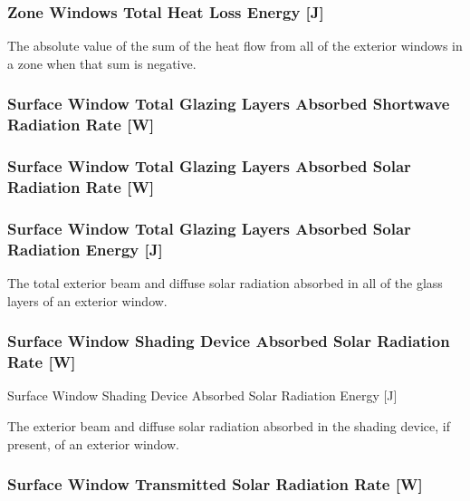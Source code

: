 \subsubsection{Zone Windows Total Heat Loss Energy {[}J{]}}\label{zone-windows-total-heat-loss-energy-j}

The absolute value of the sum of the heat flow from all of the exterior windows in a zone when that sum is negative.

\subsubsection{Surface Window Total Glazing Layers Absorbed Shortwave Radiation Rate {[}W{]}}\label{surface-window-total-glazing-layers-absorbed-shortwave-radiation-rate-w}

\subsubsection{Surface Window Total Glazing Layers Absorbed Solar Radiation Rate {[}W{]}}\label{surface-window-total-glazing-layers-absorbed-solar-radiation-rate-w}

\subsubsection{Surface Window Total Glazing Layers Absorbed Solar Radiation Energy {[}J{]}}\label{surface-window-total-glazing-layers-absorbed-solar-radiation-energy-j}

The total exterior beam and diffuse solar radiation absorbed in all of the glass layers of an exterior window.

\subsubsection{Surface Window Shading Device Absorbed Solar Radiation Rate {[}W{]}}\label{surface-window-shading-device-absorbed-solar-radiation-rate-w}

Surface Window Shading Device Absorbed Solar Radiation Energy {[}J{]}

The exterior beam and diffuse solar radiation absorbed in the shading device, if present, of an exterior window.

\subsubsection{Surface Window Transmitted Solar Radiation Rate {[}W{]}}\label{surface-window-transmitted-solar-radiation-rate-w}

